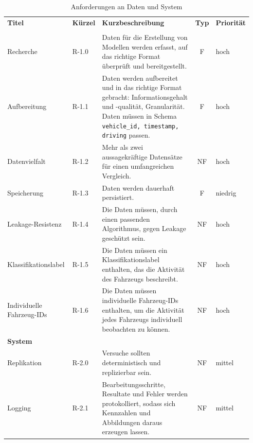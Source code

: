 \clearpage
\begin{landscape}
\querkopf
\begin{table}[H]
    \centering
    \caption{Anforderungen an Daten und System}
    \label{tab:anforderungen}
    \begin{tabularx}{\linewidth}{|l|l|X|c|l|}
        \hline
        \textbf{Titel} & \textbf{Kürzel} & \textbf{Kurzbeschreibung} & \textbf{Typ} & \textbf{Priorität} \\
        \Xhline{1pt}
        \multicolumn{5}{|l|}{\textbf{Daten}} \\
        \Xhline{1pt}
        Recherche    & R-1.0 & Daten für die Erstellung von Modellen werden erfasst, auf das richtige Format überprüft und bereitgestellt. & F & hoch   \\
        \hline
        Aufbereitung & R-1.1 & Daten werden aufbereitet und in das richtige Format gebracht: Informationsgehalt und -qualität, Granularität. Daten müssen in Schema \texttt{vehicle\_id, timestamp, driving} passen. & F & hoch \\
        \hline
        Datenvielfalt      & R-1.2 & Mehr als zwei aussagekräftige Datensätze für einen umfangreichen Vergleich. & NF & hoch   \\
        \hline
        Speicherung  & R-1.3 & Daten werden dauerhaft persistiert. & F & niedrig \\
        \hline
        Leakage-Resistenz      & R-1.4 & Die Daten müssen, durch einen passenden Algorithmus, gegen Leakage geschützt sein. & NF & hoch   \\
        \hline
        Klassifika\-tionslabel      & R-1.5 & Die Daten müssen ein Klassifikationslabel enthalten, das die Aktivität des Fahrzeugs beschreibt. & NF & hoch   \\
        \hline
        Individuelle Fahrzeug-IDs      & R-1.6 & Die Daten müssen individuelle Fahrzeug-IDs enthalten, um die Aktivität jedes Fahrzeugs individuell beobachten zu können. & NF & hoch   \\
        \hline
        \multicolumn{5}{|l|}{\textbf{System}} \\
        \Xhline{1pt}
        Replikation      & R-2.0 & Versuche sollten deterministisch und replizierbar sein. & NF & mittel   \\
        \hline
        Logging & R-2.1 & Bearbeitungsschritte, Resultate und Fehler werden protokolliert, sodass sich Kennzahlen und Abbildungen daraus erzeugen lassen. & NF & mittel \\
        \hline
    \end{tabularx}
\end{table}


\end{landscape}
